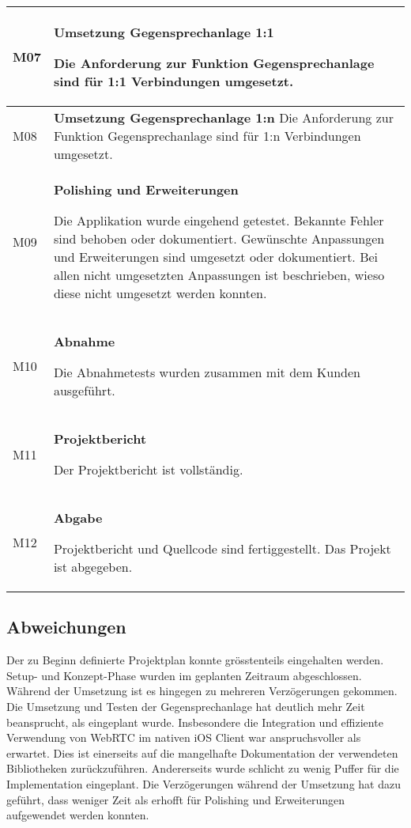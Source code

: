 \begin{table}[h]
\begin{tabular}{|l|p{15cm}|}
        M07         & \textbf{Umsetzung Gegensprechanlage 1:1}

        Die Anforderung zur Funktion Gegensprechanlage sind für 1:1 Verbindungen umgesetzt. \\
        \hline

        M08         & \textbf{Umsetzung Gegensprechanlage 1:n}
        Die Anforderung zur Funktion Gegensprechanlage sind für 1:n Verbindungen umgesetzt. \\
        \hline

        M09         & \textbf{Polishing und Erweiterungen}

        Die Applikation wurde eingehend getestet.
        Bekannte Fehler sind behoben oder dokumentiert.
        Gewünschte Anpassungen und Erweiterungen sind umgesetzt oder dokumentiert.
        Bei allen nicht umgesetzten Anpassungen ist beschrieben, wieso diese nicht umgesetzt werden konnten.
        \\
        \hline

        M10         & \textbf{Abnahme}

        Die Abnahmetests wurden zusammen mit dem Kunden ausgeführt. \\
        \hline

        M11         & \textbf{Projektbericht}

        Der Projektbericht ist vollständig.\\
        \hline

        M12         & \textbf{Abgabe}

        Projektbericht und Quellcode sind fertiggestellt.
        Das Projekt ist abgegeben.\\
        \hline
    \end{tabular}\label{tab:milestones}
\end{table}

\subsection{Abweichungen}

Der zu Beginn definierte Projektplan konnte grösstenteils eingehalten werden.
Setup- und Konzept-Phase wurden im geplanten Zeitraum abgeschlossen.
Während der Umsetzung ist es hingegen zu mehreren Verzögerungen gekommen.
Die Umsetzung und Testen der Gegensprechanlage hat deutlich mehr Zeit beansprucht, als eingeplant wurde.
Insbesondere die Integration und effiziente Verwendung von WebRTC im nativen iOS Client war anspruchsvoller als erwartet.
Dies ist einerseits auf die mangelhafte Dokumentation der verwendeten Bibliotheken zurückzuführen.
Andererseits wurde schlicht zu wenig Puffer für die Implementation eingeplant.
Die Verzögerungen während der Umsetzung hat dazu geführt, dass weniger Zeit als erhofft für Polishing und Erweiterungen aufgewendet werden konnten.

